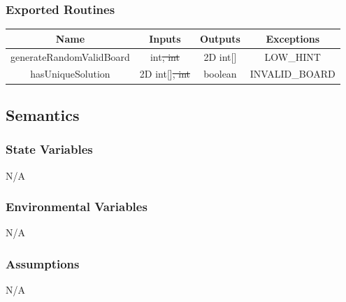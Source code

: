 \documentclass[11pt]{article}
\begin{document}
		\subsubsection{Exported Routines}
		\begin{tabular}[width=\textwidth, pos]{|c|c|c|c|}
			
			\hline
			\textbf{Name}& \textbf{Inputs} & \textbf{Outputs} & \textbf{Exceptions} \\ \hline
			generateRandomValidBoard & int\sout{, int} & 2D int[] & LOW\_HINT \\ 
			hasUniqueSolution & 2D int[]\sout{, int} & boolean & INVALID\_BOARD \\ 
			\hline
			
		\end{tabular}
		
		\subsection{Semantics}
		\subsubsection{State Variables}
		N/A
		
		\subsubsection{Environmental Variables}
		N/A
		
		\subsubsection{Assumptions}
		N/A
		
\end{document}

